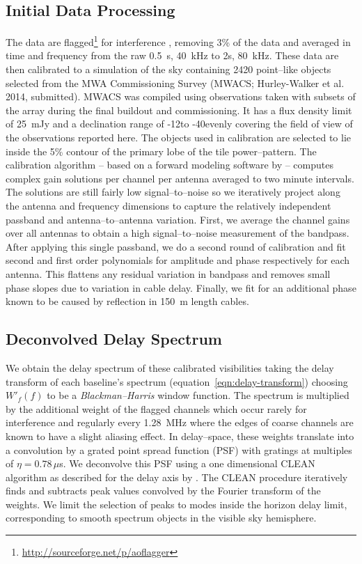\documentclass[preprint2,iop,numberedappendix]{emulateapj}
\begin{document}
\subsection{Initial Data Processing}\label{sec:data-analysis}

The data are flagged\footnote{\url{http://sourceforge.net/p/aoflagger}} for interference \citep{off12,off10}, removing 3\% of the data and averaged in time  and frequency from the raw 0.5~s, 40~kHz to 2s, 80~kHz. These data are then calibrated to a simulation of the sky containing 2420 point--like objects selected from the MWA Commissioning Survey (MWACS; Hurley-Walker et al. 2014, submitted). MWACS was compiled using observations taken with subsets of the array during the final buildout and commissioning. It has a flux density limit of 25~mJy and a declination range of -12\arcdeg to -40\arcdeg evenly covering the field of view of the observations reported here. The objects used in calibration are selected to lie inside the 5\% contour of the primary lobe of the tile power--pattern. The calibration algorithm -- based on a forward modeling software by \citet{sul12} -- computes complex gain solutions per channel per antenna averaged to two minute intervals. The solutions are still fairly low signal--to--noise so we iteratively project along the antenna and frequency dimensions to capture the relatively independent passband and antenna--to--antenna variation. First, we average the channel gains over all antennas to obtain a high signal--to--noise measurement of the bandpass. After applying this single passband, we do a second round of calibration and fit second and first order polynomials for amplitude and phase respectively for each antenna. This flattens any residual variation in bandpass and removes small phase slopes due to variation in cable delay. Finally, we fit for an additional phase known to be caused by reflection in 150~m length cables. %

\subsection{Deconvolved Delay Spectrum}\label{sec:data-delay-spectrum}

We obtain the delay spectrum of these calibrated visibilities taking the delay transform of each baseline's spectrum (equation~\ref{eqn:delay-transform}) choosing $W'_f(f)$ to be a {\it Blackman--Harris} window function. The spectrum is multiplied by the additional weight of the flagged channels which occur rarely for interference and regularly every 1.28~MHz where the edges of coarse channels are known to have a slight aliasing effect. In delay--space, these weights translate into a convolution by a grated point spread function (PSF) with gratings at multiples of $\eta=0.78\,\mu$s. We deconvolve this PSF using a one dimensional CLEAN algorithm \citep{tay99} as described for the delay axis by \citet{par09,par12}. The CLEAN procedure iteratively finds and subtracts peak values convolved by the Fourier transform of the weights. We limit the selection of peaks to modes inside the horizon delay limit, corresponding to smooth spectrum objects in the visible sky hemisphere.
\end{document}

